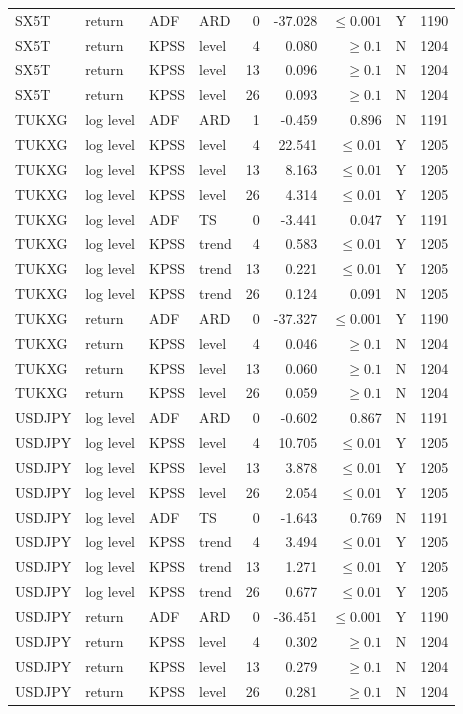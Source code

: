 {\begin{longtable}{@{}llllrrrrr@{}}
SX5T & return & ADF & ARD & 0 & -37.028 & $\leq 0.001$ & Y & 1190\\
SX5T & return & KPSS & level & 4 & 0.080 & $\geq 0.1$ & N & 1204\\
SX5T & return & KPSS & level & 13 & 0.096 & $\geq 0.1$ & N & 1204\\
SX5T & return & KPSS & level & 26 & 0.093 & $\geq 0.1$ & N & 1204\\
TUKXG & log level & ADF & ARD & 1 & -0.459 & 0.896 & N & 1191\\
TUKXG & log level & KPSS & level & 4 & 22.541 & $\leq 0.01$ & Y & 1205\\
TUKXG & log level & KPSS & level & 13 & 8.163 & $\leq 0.01$ & Y & 1205\\
TUKXG & log level & KPSS & level & 26 & 4.314 & $\leq 0.01$ & Y & 1205\\
TUKXG & log level & ADF & TS & 0 & -3.441 & 0.047 & Y & 1191\\
TUKXG & log level & KPSS & trend & 4 & 0.583 & $\leq 0.01$ & Y & 1205\\
TUKXG & log level & KPSS & trend & 13 & 0.221 & $\leq 0.01$ & Y & 1205\\
TUKXG & log level & KPSS & trend & 26 & 0.124 & 0.091 & N & 1205\\
TUKXG & return & ADF & ARD & 0 & -37.327 & $\leq 0.001$ & Y & 1190\\
TUKXG & return & KPSS & level & 4 & 0.046 & $\geq 0.1$ & N & 1204\\
TUKXG & return & KPSS & level & 13 & 0.060 & $\geq 0.1$ & N & 1204\\
TUKXG & return & KPSS & level & 26 & 0.059 & $\geq 0.1$ & N & 1204\\
USDJPY & log level & ADF & ARD & 0 & -0.602 & 0.867 & N & 1191\\
USDJPY & log level & KPSS & level & 4 & 10.705 & $\leq 0.01$ & Y & 1205\\
USDJPY & log level & KPSS & level & 13 & 3.878 & $\leq 0.01$ & Y & 1205\\
USDJPY & log level & KPSS & level & 26 & 2.054 & $\leq 0.01$ & Y & 1205\\
USDJPY & log level & ADF & TS & 0 & -1.643 & 0.769 & N & 1191\\
USDJPY & log level & KPSS & trend & 4 & 3.494 & $\leq 0.01$ & Y & 1205\\
USDJPY & log level & KPSS & trend & 13 & 1.271 & $\leq 0.01$ & Y & 1205\\
USDJPY & log level & KPSS & trend & 26 & 0.677 & $\leq 0.01$ & Y & 1205\\
USDJPY & return & ADF & ARD & 0 & -36.451 & $\leq 0.001$ & Y & 1190\\
USDJPY & return & KPSS & level & 4 & 0.302 & $\geq 0.1$ & N & 1204\\
USDJPY & return & KPSS & level & 13 & 0.279 & $\geq 0.1$ & N & 1204\\
USDJPY & return & KPSS & level & 26 & 0.281 & $\geq 0.1$ & N & 1204\\
\bottomrule
\end{longtable}
}
\par\medskip
